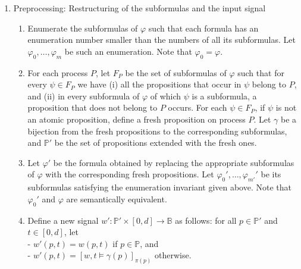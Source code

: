 \documentclass[envcountsame, runningheads]{llncs}
\newcommand{\rednote}[2][]{{\todo[color=magenta!80,size=\footnotesize,#1]{\normalcolor\normalfont#2}}}
\newcommand{\B}{\mathbb{B}}
\newcommand{\?}{\text{?}}
\begin{document}
	\begin{enumerate}
		\item Preprocessing: Restructuring of the subformulas and the input signal
		\begin{enumerate}[label=\arabic*.]
			\item Enumerate the subformulas of $\varphi$ such that each formula has an enumeration number smaller than the numbers of all its subformulas. Let $\varphi_0, \ldots, \varphi_m$ be such an enumeration. Note that $\varphi_0 = \varphi$.
			\item For each process $P$, let $F_P$ be the set of subformulas of $\varphi$ such that for every  $\psi \in F_P$ we have (i) all the propositions that occur in $\psi$ belong to $P$, and (ii) in every subformula of $\varphi$ of which $\psi$ is a subformula, a proposition that does not belong to $P$ occurs. For each $\psi \in F_P$, if $\psi$ is not an atomic proposition, define a fresh proposition on process $P$. Let $\gamma$ be a bijection from the fresh propositions to the corresponding subformulas, and $\mathbb{P}'$ be the set of propositions extended with the fresh ones.
			\item Let $\varphi'$ be the formula obtained by replacing the appropriate subformulas of $\varphi$ with the corresponding fresh propositions. Let $\varphi_0', \ldots, \varphi_{m'}'$ be its subformulas satisfying the enumeration invariant given above. Note that $\varphi_0'$  and $\varphi$ are semantically equivalent. %
			\item Define a new signal $w' : \mathbb{P}' \times [0,d] \to \B$ as follows: for all $p \in \mathbb{P}'$ and $t \in [0,d]$, let \\
			- $w'(p,t) = w(p,t)$ if $p \in \mathbb{P}$, and\\
			- $w'(p,t) = [w,t \models \gamma(p)]_{\pi(p)}$ otherwise.
		\end{enumerate}
		

\end{enumerate}
\end{document}
